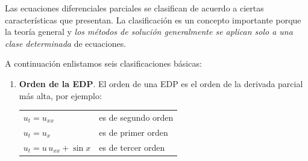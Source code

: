 Las ecuaciones diferenciales parciales se clasifican de acuerdo a ciertas características que presentan. La clasificación es un concepto importante porque la teoría general y \emph{los métodos de solución generalmente se aplican solo a una clase determinada} de ecuaciones.
\par
A continuación enlistamos seis clasificaciones básicas:
\begin{enumerate}
\item \textbf{Orden de la EDP}. El orden de una EDP es el orden de la derivada parcial más alta, por ejemplo:
\begin{table}[H]
\centering
\large
\begin{tabular}{l l}
\Large{$u_{t} = u_{xx}$} & es de segundo orden \\
\Large{$u_{t} = u_{x}$} & es de primer orden \\
\Large{$u_{t} = u \, u_{xx} + \sin x$} & es de tercer orden
\end{tabular}
\end{table}


\end{enumerate}

